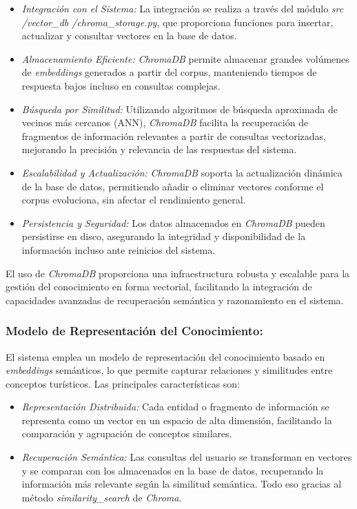 \documentclass[10pt]{llncs}
\begin{document}
\begin{itemize}
    \item \textit{Integración con el Sistema:} La integración se realiza a través del módulo \newline\textit{src /vector\_db /chroma\_storage.py}, que proporciona funciones para insertar, actualizar y consultar vectores en la base de datos.
    \item \textit{Almacenamiento Eficiente:} \textit{ChromaDB} permite almacenar grandes volúmenes de \textit{embeddings} generados a partir del corpus, manteniendo tiempos de respuesta bajos incluso en consultas complejas.
    \item \textit{Búsqueda por Similitud:} Utilizando algoritmos de búsqueda aproximada de vecinos más cercanos (ANN), \textit{ChromaDB} facilita la recuperación de fragmentos de información relevantes a partir de consultas vectorizadas, mejorando la precisión y relevancia de las respuestas del sistema.
    \item \textit{Escalabilidad y Actualización:} \textit{ChromaDB} soporta la actualización dinámica de la base de datos, permitiendo añadir o eliminar vectores conforme el corpus evoluciona, sin afectar el rendimiento general.
    \item \textit{Persistencia y Seguridad:} Los datos almacenados en \textit{ChromaDB} pueden persistirse en disco, asegurando la integridad y disponibilidad de la información incluso ante reinicios del sistema.
\end{itemize}

El uso de \textit{ChromaDB} proporciona una infraestructura robusta y escalable para la gestión del conocimiento en forma vectorial, facilitando la integración de capacidades avanzadas de recuperación semántica y razonamiento en el sistema.

\subsubsection{Modelo de Representación del Conocimiento:}

El sistema emplea un modelo de representación del conocimiento basado en \textit{embeddings} semánticos, lo que permite capturar relaciones y similitudes entre conceptos turísticos. Las principales características son:

\begin{itemize}
    \item \textit{Representación Distribuida:} Cada entidad o fragmento de información se representa como un vector en un espacio de alta dimensión, facilitando la comparación y agrupación de conceptos similares.
    \item \textit{Recuperación Semántica:} Las consultas del usuario se transforman en vectores y se comparan con los almacenados en la base de datos, recuperando la información más relevante según la similitud semántica. Todo 
    eso gracias al método \textit{similarity\_search} de \textit{Chroma}.
\end{itemize}
\end{document}
